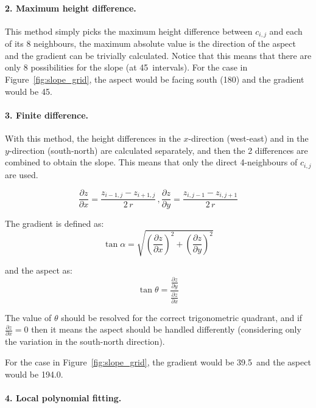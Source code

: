 \paragraph{2. Maximum height difference.}
This method simply picks the maximum height difference between $c_{i,j}$ and each of its 8 neighbours, the maximum absolute value is the direction of the aspect and the gradient can be trivially calculated.
Notice that this means that there are only 8 possibilities for the slope (at 45\degree\ intervals).
For the case in Figure~\ref{fig:slope_grid}, the aspect would be facing south (180\degree) and the gradient would be 45\degree.


\paragraph{3. Finite difference.}

With this method, the height differences in the $x$-direction (west-east) and in the $y$-direction (south-north) are calculated separately, and then the 2 differences are combined to obtain the slope.
This means that only the direct 4-neighbours of $c_{i,j}$ are used.

\begin{equation}
  \frac{\partial z}{\partial x} = \frac{z_{i-1,j} - z_{i+1,j}}{2\,r}
\, , 
  \frac{\partial z}{\partial y} = \frac{z_{i,j-1} - z_{i,j+1}}{2\,r}
\end{equation}

The gradient is defined as:
\begin{equation}
  \tan \alpha = \sqrt{(\frac{\partial z}{\partial x})^2 + (\frac{\partial z}{\partial y})^2}
\end{equation}

and the aspect as:
\begin{equation}
  \tan \theta = \frac{\frac{\partial z}{\partial y}}{\frac{\partial z}{\partial x}}
\end{equation}

The value of $\theta$ should be resolved for the correct trigonometric quadrant, and if $\frac{\partial z}{\partial x} = 0$ then it means the aspect should be handled differently (considering only the variation in the south-north direction). 

For the case in Figure~\ref{fig:slope_grid}, the gradient would be 39.5\degree\ and the aspect would be 194.0\degree.


\paragraph{4. Local polynomial fitting.}%
\label{sec:polynomial}

